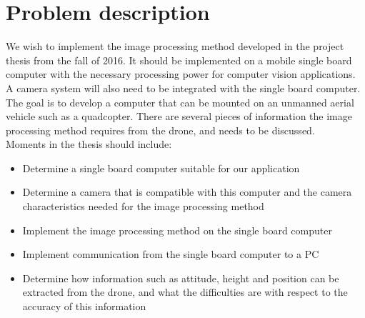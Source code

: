 \section*{Problem description}
We wish to implement the image processing method developed in the project thesis from the fall of 2016. It should be implemented on a mobile single board computer with the necessary processing power for computer vision applications. A camera system will also need to be integrated with the single board computer. The goal is to develop a computer that can be mounted on an unmanned aerial vehicle such as a quadcopter. There are several pieces of information the image processing method requires from the drone, and needs to be discussed.\\ 


Moments in the thesis should include:

\begin{itemize}
\item Determine a single board computer suitable for our application
\item Determine a camera that is compatible with this computer and the camera characteristics needed for the image processing method
\item Implement the image processing method on the single board computer 
\item Implement communication from the single board computer to a PC
\item Determine how information such as attitude, height and position can be extracted from the drone, and what the difficulties are with respect to the accuracy of this information
\end{itemize}
